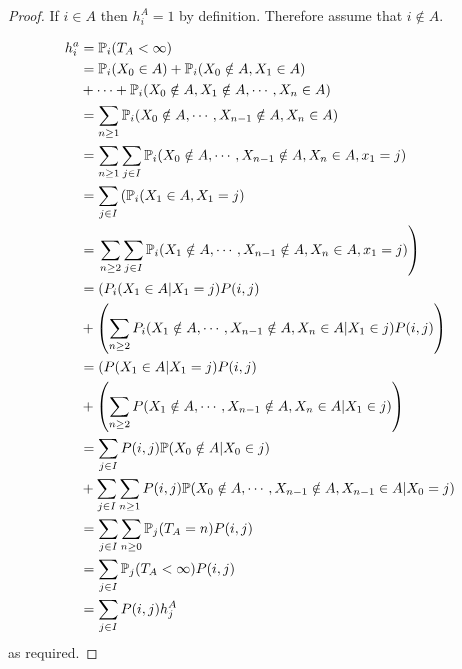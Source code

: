 \documentclass[../Main.tex]{subfiles}
\begin{document}
\begin{proof}
    If $i \in A$ then $h_i^A = 1$ by definition. Therefore assume that $i \notin A$.

    \begin{align*}
        h_i^a &= \P_i(T_A < \infty) \\
        &= \P_i(X_0 \in A) + \P_i(X_0 \notin A, X_1 \in A) \\
        &+ \cdots + \P_i(X_0 \notin A, X_1 \notin A, \cdots, X_n \in A) \\
        &= \sum_{n \geq 1} \P_i(X_0 \notin A, \cdots, X_{n-1} \notin A, X_n \in A) \\
        &= \sum_{n \geq 1} \sum_{j \in I}\P_i (X_0 \notin A, \cdots, X_{n-1} \notin A, X_n \in A, x_1 = j) \\
        &= \sum_{j \in I} \left(\P_i(X_1 \in A, X_1 = j) \right. \\
        &= \left.\sum_{n \geq 2} \sum_{j \in I}\P_i (X_1 \notin A, \cdots, X_{n-1} \notin A, X_n \in A, x_1 = j)\right) \\
        &= \left(P_i(X_1 \in A | X_1 = j) P(i, j)\right. \\
        &+ \left(\sum_{n\geq 2} P_i(X_1 \notin A, \cdots, X_{n-1} \notin A, X_n \in A | X_1 \in j)P(i, j)\right) \\
        &= \left(P(X_1 \in A | X_1 = j) P(i, j)\right. \\
        &+ \left(\sum_{n\geq 2} P(X_1 \notin A, \cdots, X_{n-1} \notin A, X_n \in A | X_1 \in j)\right) \\
        &= \sum_{j \in I} P(i, j) \P(X_0 \notin A | X_0 \in j) \\
        &+ \sum_{j \in I} \sum_{n \geq 1} P(i, j) \P(X_0 \notin A, \cdots, X_{n-1} \notin A, X_{n-1} \in A | X_0 = j) \\
        &= \sum_{j \in I} \sum_{n \geq 0} \P_j(T_A = n) P(i, j) \\
        &= \sum_{j \in I} \P_j(T_A < \infty) P(i, j) \\
        &= \sum_{j \in I} P(i, j) h_j^A \\
    \end{align*}
    as required.


\end{proof}
\end{document}
